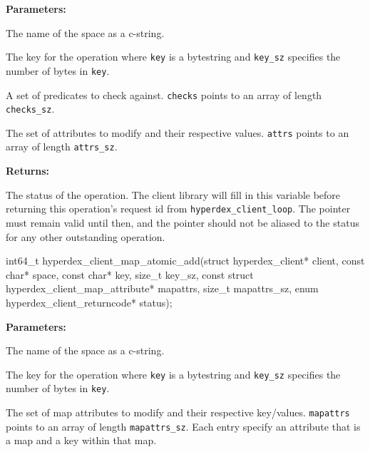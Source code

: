 \noindent\textbf{Parameters:}
\begin{description}[labelindent=\widthof{{\texttt{checks}, \texttt{checks\_sz}}},leftmargin=*,noitemsep,nolistsep,align=right]
\item[\texttt{space}] The name of the space as a c-string.
\item[\texttt{key}, \texttt{key\_sz}] The key for the operation where \texttt{key} is a bytestring and \texttt{key\_sz} specifies the number of bytes in \texttt{key}.
\item[\texttt{checks}, \texttt{checks\_sz}] A set of predicates to check against.  \texttt{checks} points to an array of length \texttt{checks\_sz}.
\item[\texttt{attrs}, \texttt{attrs\_sz}] The set of attributes to modify and their respective values.  \texttt{attrs} points to an array of length \texttt{attrs\_sz}.
\end{description}

\noindent\textbf{Returns:}
\begin{description}[labelindent=\widthof{{\texttt{status}}},leftmargin=*,noitemsep,nolistsep,align=right]
\item[\texttt{status}] The status of the operation.  The client library will fill in this variable before returning this operation's request id from \texttt{hyperdex\_client\_loop}.  The pointer must remain valid until then, and the pointer should not be aliased to the status for any other outstanding operation.
\end{description}

\funcsep
\begin{ccode}
int64_t hyperdex_client_map_atomic_add(struct hyperdex_client* client,
                const char* space,
                const char* key, size_t key_sz,
                const struct hyperdex_client_map_attribute* mapattrs, size_t mapattrs_sz,
                enum hyperdex_client_returncode* status);
\end{ccode}
\funcdesc 

\noindent\textbf{Parameters:}
\begin{description}[labelindent=\widthof{{\texttt{mapattrs}, \texttt{mapattrs\_sz}}},leftmargin=*,noitemsep,nolistsep,align=right]
\item[\texttt{space}] The name of the space as a c-string.
\item[\texttt{key}, \texttt{key\_sz}] The key for the operation where \texttt{key} is a bytestring and \texttt{key\_sz} specifies the number of bytes in \texttt{key}.
\item[\texttt{mapattrs}, \texttt{mapattrs\_sz}] The set of map attributes to modify and their respective key/values.  \texttt{mapattrs} points to an array of length \texttt{mapattrs\_sz}.  Each entry specify an attribute that is a map and a key within that map.
\end{description}

